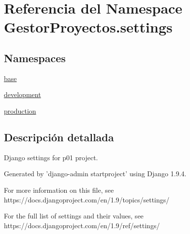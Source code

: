 \hypertarget{namespace_gestor_proyectos_1_1settings}{}\section{Referencia del Namespace Gestor\+Proyectos.\+settings}
\label{namespace_gestor_proyectos_1_1settings}
\subsection*{Namespaces}
\begin{DoxyCompactItemize}
\item 
 \hyperlink{namespace_gestor_proyectos_1_1settings_1_1base}{base}
\item 
 \hyperlink{namespace_gestor_proyectos_1_1settings_1_1development}{development}
\item 
 \hyperlink{namespace_gestor_proyectos_1_1settings_1_1production}{production}
\end{DoxyCompactItemize}


\subsection{Descripción detallada}
\begin{DoxyVerb}Django settings for p01 project.

Generated by 'django-admin startproject' using Django 1.9.4.

For more information on this file, see
https://docs.djangoproject.com/en/1.9/topics/settings/

For the full list of settings and their values, see
https://docs.djangoproject.com/en/1.9/ref/settings/
\end{DoxyVerb}
 
